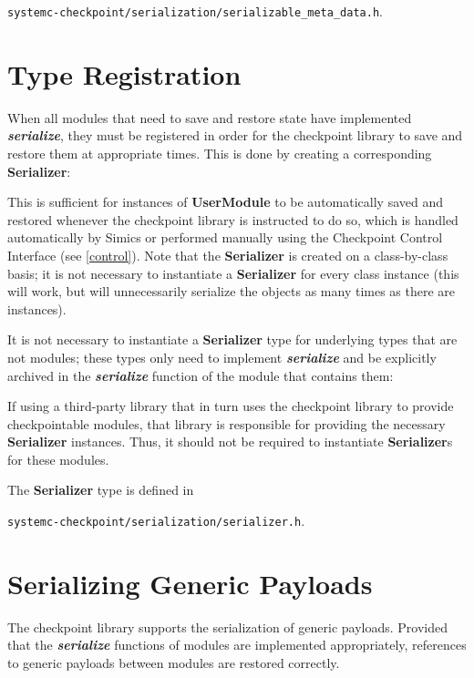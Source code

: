 \documentclass[oneside]{memoir}
\begin{document}
\texttt{systemc-checkpoint/serialization/serializable\_meta\_data.h}.

\section{Type Registration}
\label{type-registration}

When all modules that need to save and restore state have implemented \textit{\textbf{serialize}}, they must be registered in order for the checkpoint library to save and restore them at appropriate times.
This is done by creating a corresponding \textbf{Serializer}:



This is sufficient for instances of \textbf{UserModule} to be automatically saved and restored whenever the checkpoint library is instructed to do so, which is handled automatically by Simics or performed manually using the Checkpoint Control Interface (see \ref{control}).
Note that the \textbf{Serializer} is created on a class-by-class basis; it is not necessary to instantiate a \textbf{Serializer} for every class instance (this will work, but will unnecessarily serialize the objects as many times as there are instances).

It is not necessary to instantiate a \textbf{Serializer} type for underlying types that are not modules; these types only need to implement \textit{\textbf{serialize}} and be explicitly archived in the \textit{\textbf{serialize}} function of the module that contains them:



If using a third-party library that in turn uses the checkpoint library to provide checkpointable modules, that library is responsible for providing the necessary \textbf{Serializer} instances.
Thus, it should not be required to instantiate \textbf{Serializer}s for these modules.

The \textbf{Serializer} type is defined in

\texttt{systemc-checkpoint/serialization/serializer.h}.

\section{Serializing Generic Payloads}
\label{generic-payloads}

The checkpoint library supports the serialization of generic payloads.
Provided that the \textit{\textbf{serialize}} functions of modules are implemented appropriately, references to generic payloads between modules are restored correctly.
\end{document}
